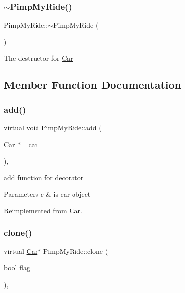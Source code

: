\subsubsection{\texorpdfstring{$\sim$\+Pimp\+My\+Ride()}{~PimpMyRide()}}
{\footnotesize\ttfamily Pimp\+My\+Ride\+::$\sim$\+Pimp\+My\+Ride (\begin{DoxyParamCaption}{ }\end{DoxyParamCaption})\hspace{0.3cm}{\ttfamily [inline]}}

The destructor for \mbox{\hyperlink{class_car}{Car}} 

\subsection{Member Function Documentation}
\mbox{\label{class_pimp_my_ride_a2293a4df894794145696d7610efe3056}} 
\subsubsection{\texorpdfstring{add()}{add()}}
{\footnotesize\ttfamily virtual void Pimp\+My\+Ride\+::add (\begin{DoxyParamCaption}\item[{\mbox{\hyperlink{class_car}{Car}} $\ast$}]{\+\_\+car }\end{DoxyParamCaption})\hspace{0.3cm}{\ttfamily [inline]}, {\ttfamily [virtual]}}

add function for decorator 
\begin{DoxyParams}{Parameters}
{\em c} & is car object \\
\hline
\end{DoxyParams}


Reimplemented from \mbox{\hyperlink{class_car_aca44e1a112ae22217c8004e92a86c374}{Car}}.

\mbox{\label{class_pimp_my_ride_a37648eb844eb3e5967d0d3a6a8f0469d}} 
\subsubsection{\texorpdfstring{clone()}{clone()}}
{\footnotesize\ttfamily virtual \mbox{\hyperlink{class_car}{Car}}$\ast$ Pimp\+My\+Ride\+::clone (\begin{DoxyParamCaption}\item[{bool}]{flag\+\_\+ }\end{DoxyParamCaption})\hspace{0.3cm}{\ttfamily [inline]}, {\ttfamily [virtual]}}

